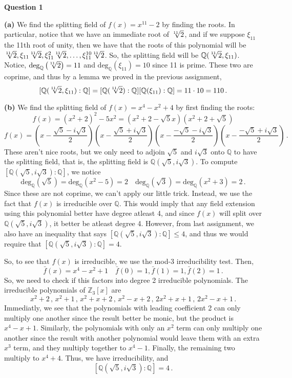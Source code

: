 \documentclass[10pt]{article}
\newcommand{\Z}{\mathbb{Z}}
\newcommand{\Q}{\mathbb{Q}}
\begin{document}
\textbf{Question 1}

\textbf{(a)} We find the splitting field of $f(x) = x^{11} - 2$ by finding the roots. In particular, notice that we have an immediate root of $\sqrt[\leftroot{1}\uproot{0}11]{2}$, and if we suppose $\xi_{11}$ the 11th root of unity, then we have that the roots of this polynomial will be $\sqrt[\leftroot{1}\uproot{0}11]{2}, \xi_{11}\sqrt[\leftroot{1}\uproot{0}11]{2}, \xi_{11}^{2}\sqrt[\leftroot{1}\uproot{0}11]{2}, \dots, \xi_{11}^{10}\sqrt[\leftroot{1}\uproot{0}11]{2}$. So, the splitting field will be $\Q(\sqrt[\leftroot{1}\uproot{0}11]{2}, \xi_{11})$. Notice, $\text{deg}_{\Q}\left(\sqrt[\leftroot{1}\uproot{0}11]{2}\right) = 11$ and $\text{deg}_{\Q}(\xi_{11}) = 10$ since 11 is prime. These two are coprime, and thus by a lemma we proved in the previous assignment,
\[ [\Q(\sqrt[\leftroot{1}\uproot{0}11]{2},\xi_{11}): \Q] = [\Q(\sqrt[\leftroot{1}\uproot{0}11]{2}):\Q][\Q(\xi_{11}):\Q] = 11\cdot 10 = 110\, .\]

\textbf{(b)} We find the splitting field of $f(x) = x^{4} - x^{2} + 4$ by first finding the roots:
\[ f(x) = (x^{2} + 2)^{2} - 5x^{2} = (x^{2} + 2 - \sqrt{5}x)(x^{2} + 2 + \sqrt{5})\]
\[ f(x) = \left(x - \frac{\sqrt{5} - i\sqrt{3}}{2}\right) \left(x - \frac{\sqrt{5} + i\sqrt{3}}{2}\right) \left(x - \frac{-\sqrt{5} - i\sqrt{3}}{2}\right) \left(x - \frac{-\sqrt{5} + i\sqrt{3}}{2}\right)\, .\]
These aren't nice roots, but we only need to adjoin $\sqrt{5}$ and $i\sqrt{3}$ onto $\Q$ to have the splitting field, that is, the splitting field is $\Q(\sqrt{5},i\sqrt{3})$. To compute $[\Q(\sqrt{5},i\sqrt{3}):\Q]$, we notice
\[ \text{deg}_{\Q}(\sqrt{5}) = \text{deg}_{\Q}(x^{2} - 5) = 2 \quad \text{deg}_{\Q}(\sqrt{3}) = \text{deg}_{\Q}(x^{2} + 3) = 2\, .\]
Since these are not coprime, we can't apply our little trick. Instead, we use the fact that $f(x)$ is irreducible over $\Q$. This would imply that any field extension using this polynomial better have degree atleast 4, and since $f(x)$ will split over $\Q(\sqrt{5},i\sqrt{3})$, it better be atleast degree 4. However, from last assignment, we also have an inequality that says $[\Q(\sqrt{5},i\sqrt{3}):\Q] \leq 4$, and thus we would require that $[\Q(\sqrt{5},i\sqrt{3}):\Q] = 4$.

So, to see that $f(x)$ is irreducible, we use the mod-3 irreducibility test. Then,
\[ \bar{f}(x) = x^{4} - x^{2} + 1 \quad \bar{f}(0) = 1,\bar{f}(1) = 1, \bar{f}(2) = 1 \, .\]
So, we need to check if this factors into degree 2 irreducible polynomials. The irreducible polynomials of $\Z_{3}[x]$ are
\[ x^{2}+2\, ,\, x^{2}+1\, , \, x^{2}+x+2\, ,\, x^{2}-x+2\,,\,2x^{2}+x+1\,,\,2x^{2}-x+1 \, .\]
Immediatly, we see that the polynomials with leading coefficient 2 can only multiply one another since the result better be monic, but the product is $x^{4} - x + 1$. Similarly, the polynomials with only an $x^{2}$ term can only multiply one another since the result with another polynomial would leave them with an extra $x^{3}$ term, and they multiply together to $x^{4} - 1$. Finally, the remaining two multiply to $x^{4} + 4$. Thus, we have irreducibility, and
\[ [\Q(\sqrt{5},i\sqrt{3}):\Q] = 4\, .\]
\end{document}
